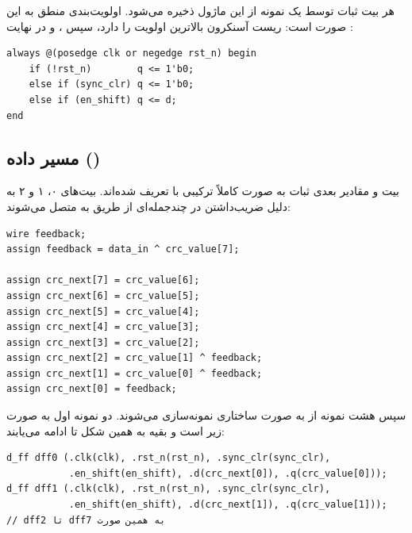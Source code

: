 هر بیت ثبات  توسط یک نمونه از این ماژول ذخیره می‌شود. اولویت‌بندی
منطق به این صورت است: ریست آسنکرون بالاترین اولویت را دارد، سپس
، و در نهایت :

\begin{latin}
    \begin{lstlisting}[basicstyle=\ttfamily\small, breaklines=true,
                   postbreak=\mbox{\textcolor{red}{$\hookrightarrow$}\space}]
always @(posedge clk or negedge rst_n) begin
    if (!rst_n)        q <= 1'b0;
    else if (sync_clr) q <= 1'b0;
    else if (en_shift) q <= d;
end
\end{lstlisting}
\end{latin}

\subsection{مسیر داده ()}

بیت  و مقادیر بعدی ثبات به صورت کاملاً ترکیبی با
 تعریف شده‌اند. بیت‌های ۰، ۱ و ۲ به دلیل ضریب‌داشتن در
چندجمله‌ای  از طریق  به  متصل می‌شوند:

\begin{latin}
    \begin{lstlisting}[basicstyle=\ttfamily\small, breaklines=true,
                   postbreak=\mbox{\textcolor{red}{$\hookrightarrow$}\space}]
wire feedback;
assign feedback = data_in ^ crc_value[7];

assign crc_next[7] = crc_value[6];
assign crc_next[6] = crc_value[5];
assign crc_next[5] = crc_value[4];
assign crc_next[4] = crc_value[3];
assign crc_next[3] = crc_value[2];
assign crc_next[2] = crc_value[1] ^ feedback;
assign crc_next[1] = crc_value[0] ^ feedback;
assign crc_next[0] = feedback;
\end{lstlisting}
\end{latin}

\pagebreak

سپس هشت نمونه از  به صورت ساختاری نمونه‌سازی می‌شوند.
دو نمونه اول به صورت زیر است و بقیه به همین شکل تا  ادامه
می‌یابند:

\begin{latin}
    \begin{lstlisting}[basicstyle=\ttfamily\small, breaklines=true,
                   postbreak=\mbox{\textcolor{red}{$\hookrightarrow$}\space}]
d_ff dff0 (.clk(clk), .rst_n(rst_n), .sync_clr(sync_clr),
           .en_shift(en_shift), .d(crc_next[0]), .q(crc_value[0]));
d_ff dff1 (.clk(clk), .rst_n(rst_n), .sync_clr(sync_clr),
           .en_shift(en_shift), .d(crc_next[1]), .q(crc_value[1]));
// dff2 تا dff7 به همین صورت
\end{lstlisting}
\end{latin}

